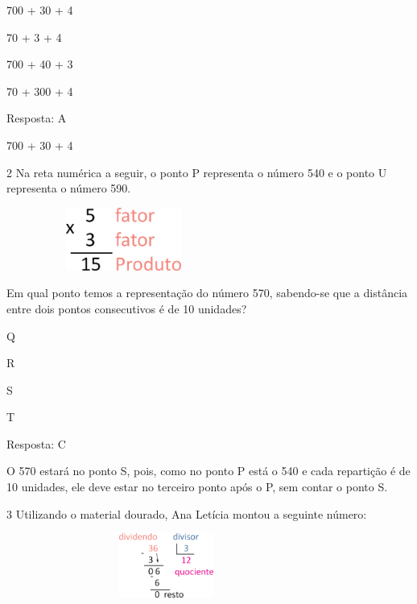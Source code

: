 \begin{escolha}

\item
  700 + 30 + 4
\item
  70 + 3 + 4
\item
  700 + 40 + 3
\item
  70 + 300 + 4
\end{escolha}

Resposta: A

700 + 30 + 4

\num{2} Na reta numérica a seguir, o ponto P representa o número 540 e o ponto U
representa o número 590.

\includegraphics[width=3.03205in,height=0.81228in]{media/image12.png}


Em qual ponto temos a representação do número 570, sabendo-se que a
distância entre dois pontos consecutivos é de 10 unidades?

\begin{escolha}

\item
  Q
\item
  R
\item
  S
\item
  T
\end{escolha}

Resposta: C

O 570 estará no ponto S, pois, como no ponto P está o 540 e cada
repartição é de 10 unidades, ele deve estar no terceiro ponto após o P,
sem contar o ponto S.

\num{3} Utilizando o material dourado, Ana Letícia montou a seguinte número:

\includegraphics[width=4.13369in,height=0.83341in]{media/image13.png}


